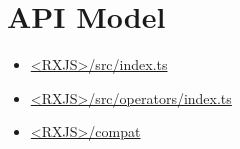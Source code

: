\section{API Model}



\begin{itemize}
  \item \href{https://github.com/ReactiveX/rxjs/blob/master/src/index.ts}
        {<RXJS>/src/index.ts}
\end{itemize}


\begin{itemize}
  \item \href{https://github.com/ReactiveX/rxjs/blob/master/src/operators/index.ts}
        {<RXJS>/src/operators/index.ts}
\end{itemize}



\begin{itemize}
  \item \href{https://github.com/ReactiveX/rxjs/tree/master/compat}
        {<RXJS>/compat}
\end{itemize}



